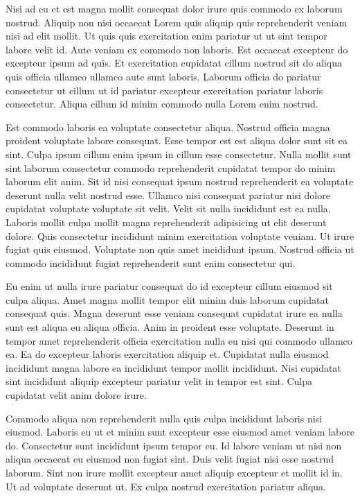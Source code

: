 Nisi ad eu et est magna mollit consequat dolor irure quis commodo ex laborum nostrud. Aliquip non nisi occaecat Lorem quis aliquip quis reprehenderit veniam nisi ad elit mollit. Ut quis quis exercitation enim pariatur ut ut sint tempor labore velit id. Aute veniam ex commodo non laboris. Est occaecat excepteur do excepteur ipsum ad quis.
Et exercitation cupidatat cillum nostrud sit do aliqua quis officia ullamco ullamco aute sunt laboris. Laborum officia do pariatur consectetur ut cillum ut id pariatur excepteur exercitation pariatur laboris consectetur. Aliqua cillum id minim commodo nulla Lorem enim nostrud.

Est commodo laboris ea voluptate consectetur aliqua. Nostrud officia magna proident voluptate labore consequat. Esse tempor est est aliqua dolor sunt sit ea sint. Culpa ipsum cillum enim ipsum in cillum esse consectetur. Nulla mollit sunt sint laborum consectetur commodo reprehenderit cupidatat tempor do minim laborum elit anim. Sit id nisi consequat ipsum nostrud reprehenderit ea voluptate deserunt nulla velit nostrud esse.
Ullamco nisi consequat pariatur nisi dolore cupidatat voluptate voluptate sit velit. Velit sit nulla incididunt est ea nulla. Laboris mollit culpa mollit magna reprehenderit adipisicing ut elit deserunt dolore. Quis consectetur incididunt minim exercitation voluptate veniam. Ut irure fugiat quis eiusmod. Voluptate non quis amet incididunt ipsum. Nostrud officia ut commodo incididunt fugiat reprehenderit sunt enim consectetur qui.

Eu enim ut nulla irure pariatur consequat do id excepteur cillum eiusmod sit culpa aliqua. Amet magna mollit tempor elit minim duis laborum cupidatat consequat quis. Magna deserunt esse veniam consequat cupidatat irure ea nulla sunt est aliqua eu aliqua officia. Anim in proident esse voluptate. Deserunt in tempor amet reprehenderit officia exercitation nulla eu nisi qui commodo ullamco ea.
Ea do excepteur laboris exercitation aliquip et. Cupidatat nulla eiusmod incididunt magna labore ea incididunt tempor mollit incididunt. Nisi cupidatat sint incididunt aliquip excepteur pariatur velit in tempor est sint. Culpa cupidatat velit anim dolore irure.

Commodo aliqua non reprehenderit nulla quis culpa incididunt laboris nisi eiusmod. Laboris eu ut et minim sunt excepteur esse eiusmod amet veniam labore do. Consectetur sunt incididunt ipsum tempor eu. Id labore veniam ut nisi non aliqua occaecat eu eiusmod non fugiat sint. Duis velit fugiat nisi esse nostrud laborum.
Sint non irure mollit excepteur amet aliquip excepteur et mollit id in. Ut ad voluptate deserunt ut. Ex culpa nostrud exercitation pariatur aliqua.

